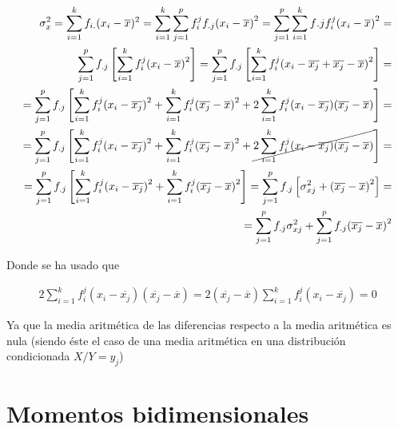 \documentclass{article}
\theoremstyle{definition}
\begin{document}
\begin{align*}
\sigma_x^2 =
	\sum_{i=1}^k f_{i.} (x_i - \overline{x})^2 =
	\sum_{i=1}^k \sum_{j=1}^p f_i^j f_{.j} {(x_i -\overline{x})}^2 =
	\sum_{j=1}^p \sum_{i=1}^k f{.j}f_i^j {(x_i - \overline{x})}^2 = \\
	\sum_{j=1}^p f_{.j} \left[
												\sum_{i=1}^k f_i^j {(x_i - \overline{x})}^2
											\right] =
	\sum_{j=1}^p f_{.j} \left[
											  \sum_{i=1}^k f_i^j
													{(x_i - \overline{x_j} +
													\overline{x_j} - \overline{x})}^2
											\right] = \\
	= \sum_{j=1}^p f_{.j} \left[
										 	 	  \sum_{i=1}^k f_i^j {(x_i - \overline{x_j})}^2 +
												  \sum_{i=1}^k f_i^j {(\overline{x_j}-\overline{x})}^2 +
											   2\sum_{i=1}^k f_i^j
											  	{(x_i - \overline{x_j})}
													 {(\overline{x_j} -\overline{x})}
												\right] = \\
= \sum_{j=1}^p f_{.j} \left[
												\sum_{i=1}^k f_i^j {(x_i - \overline{x_j})}^2 +
												\sum_{i=1}^k f_i^j {(\overline{x_j}-\overline{x})}^2
												+ \cancel{2\sum_{i=1}^k f_i^j
														{(x_i - \overline{x_j})}
														{(\overline{x_j}-\overline{x})}}
											 \right] = \\
= \sum_{j=1}^p f_{.j} \left[
												\sum_{i=1}^k f_i^j{(x_i - \overline{x_j})}^2 +
												\sum_{i=1}^k f_i^j {(\overline{x_j}-\overline{x})}^2
												\right] =
\sum_{j=1}^p f_{.j} \left[
												\sigma_{xj}^2 +
												{(\overline{x_j}-\overline{x})}^2
										\right] = \\
= \sum_{j=1}^p f_{.j} \sigma_{xj}^2 +
	\sum_{j=1}^p f_{.j} {(\overline{x_j} - \overline{x})}^2
\end{align*}

\vspace{8cm}

Donde se ha usado que

\begin{align*} 2\sum_{i=1}^k f_i^j (x_i -
\overline{x_j}){(\overline{x_j}-\overline{x})} =
2(\overline{x_j}-\overline{x})\sum_{i=1}^k f_i^j(x_i - \overline{x_j}) = 0
\end{align*}

Ya que la media aritmética de las diferencias respecto a la media aritmética es
nula (siendo éste el caso de una media aritmética en una distribución
condicionada $X/Y=y_j$)

\section{Momentos bidimensionales}
\end{document}
